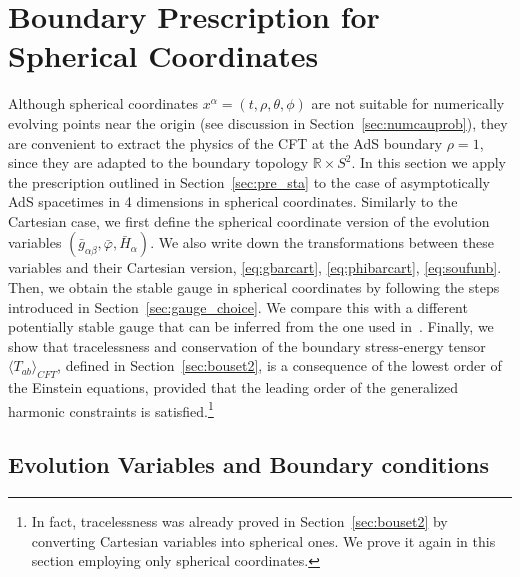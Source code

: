 \documentclass[a4paper,11pt]{article}
\numberwithin{equation}{section}
\begin{document}
\section{Boundary Prescription for Spherical Coordinates}\label{sec:sphevvarboucon}

Although spherical coordinates $x^\alpha=(t,\rho,\theta,\phi)$ are not suitable for numerically evolving points near the origin (see discussion in Section~\ref{sec:numcauprob}), they are convenient to extract the physics of the CFT at the AdS boundary $\rho=1$, since they are adapted to the boundary topology $\mathbb{R}\times S^2$.
In this section we apply the prescription outlined in Section~\ref{sec:pre_sta} to the case of asymptotically AdS spacetimes in 4 dimensions in spherical coordinates. Similarly to the Cartesian case, we first define the spherical coordinate version of the evolution variables $(\bar{g}_{\alpha\beta},\bar{\varphi},\bar{H}_\alpha)$. We also write down the transformations between these variables and their Cartesian version, \eqref{eq:gbarcart}, \eqref{eq:phibarcart}, \eqref{eq:soufunb}. Then, we obtain the stable gauge in spherical coordinates by following the steps introduced in Section~\ref{sec:gauge_choice}. We compare this with a different potentially stable gauge that can be inferred from the one used in~\cite{Bantilan:2012vu}. Finally, we show that tracelessness and conservation of the boundary stress-energy tensor $\langle T_{ab}\rangle_{CFT}$, defined in Section~\ref{sec:bouset2}, is a consequence of the lowest order of the Einstein equations, provided that the leading order of the generalized harmonic constraints is satisfied.\footnote{In fact, tracelessness was already proved in Section~\ref{sec:bouset2} by converting Cartesian variables into spherical ones. We prove it again in this section employing only spherical coordinates.}



\subsection{Evolution Variables and Boundary conditions}
\end{document}
